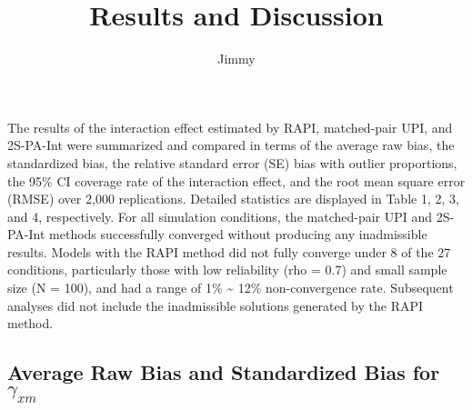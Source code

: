 \documentclass[
  man]{apa7}
\title{Results and Discussion}
\author{Jimmy\textsuperscript{}}
\date{}
\affiliation{\phantom{0}}
\begin{document}
\maketitle

The results of the interaction effect estimated by RAPI, matched-pair UPI, and 2S-PA-Int were summarized and compared in terms of the average raw bias, the standardized bias, the relative standard error (SE) bias with outlier proportions, the 95\% CI coverage rate of the interaction effect, and the root mean square error (RMSE) over 2,000 replications. Detailed statistics are displayed in Table 1, 2, 3, and 4, respectively. For all simulation conditions, the matched-pair UPI and 2S-PA-Int methods successfully converged without producing any inadmissible results. Models with the RAPI method did not fully converge under 8 of the 27 conditions, particularly those with low reliability (rho = 0.7) and small sample size (N = 100), and had a range of 1\% \textasciitilde{} 12\% non-convergence rate. Subsequent analyses did not include the inadmissible solutions generated by the RAPI method.

\hypertarget{average-raw-bias-and-standardized-bias-for-gamma_xm}{%
\subsection{\texorpdfstring{Average Raw Bias and Standardized Bias for \(\gamma_{xm}\)}{Average Raw Bias and Standardized Bias for \textbackslash gamma\_\{xm\}}}\label{average-raw-bias-and-standardized-bias-for-gamma_xm}}
\end{document}
